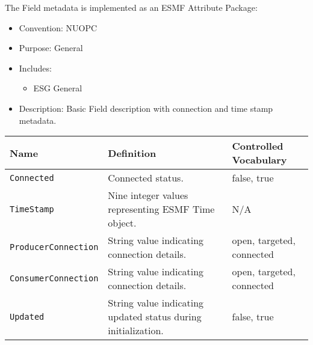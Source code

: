 \label{FieldMeta}
The Field metadata is implemented as an ESMF Attribute Package:

\begin{itemize}
    \item Convention: NUOPC
    \item Purpose: General
    \item Includes:
    \begin{itemize}
        \item ESG General
    \end{itemize} 
    \item Description: Basic Field description with connection and time stamp metadata. 
\end{itemize}

\begin{tabular}{|p{5cm}|p{5cm}|p{35mm}|}
     \hline\hline
     {\bf Name} & {\bf Definition} & {\bf Controlled Vocabulary}\\
     \hline\hline
     {\tt Connected} & Connected status.& false, true\\
     {\tt TimeStamp} & Nine integer values representing ESMF Time object.& N/A\\
     {\tt ProducerConnection} & String value indicating connection details.& open, targeted, connected\\
     {\tt ConsumerConnection} & String value indicating connection details.& open, targeted, connected\\
     {\tt Updated} & String value indicating updated status during initialization.& false, true\\
     \hline\hline
\end{tabular}
